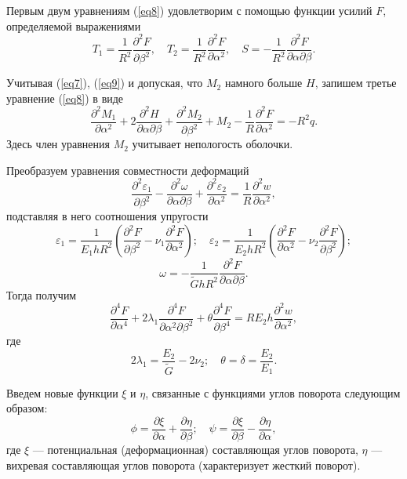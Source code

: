 \documentclass[press]{vestnik}
\begin{document}
Первым двум уравнениям (\ref{eq8}) удовлетворим с помощью функции усилий $F$, 
определяемой выражениями
\begin{equation}
\label{eq9}
T_{1} =\frac{1}{R^{2}}\frac{\partial^{2}F}{\partial \beta^{2}},
\quad
T_{2} =\frac{1}{R^{2}}\frac{\partial^{2}F}{\partial \alpha^{2}},
\quad
S=-\frac{1}{R^{2}}\frac{\partial^{2}F}{\partial \alpha \partial \beta }.
\end{equation}

Учитывая (\ref{eq7}), (\ref{eq9}) и допуская, что $M_{2} $ намного больше $H$, запишем 
третье уравнение (\ref{eq8}) в виде
\begin{equation}
\label{eq10}
\frac{\partial^{2}M_{1} }{\partial \alpha^{2}}+2\frac{\partial 
^{2}H}{\partial \alpha \partial \beta }+\frac{\partial^{2}M_{2} }{\partial 
\beta^{2}}+M_{2} -\frac{1}{R}\frac{\partial^{2}F}{\partial \alpha 
^{2}}=-R^{2}q.
\end{equation}
Здесь член уравнения $M_{2} $ учитывает непологость оболочки.

Преобразуем уравнения совместности деформаций
\[
\frac{\partial^{2}\varepsilon_{1} }{\partial \beta^{2}}-\frac{\partial 
^{2}\omega }{\partial \alpha \partial \beta }+\frac{\partial^{2}\varepsilon 
_{2} }{\partial \alpha^{2}}=\frac{1}{R}\frac{\partial^{2}w}{\partial 
\alpha^{2}},
\]
подставляя в него соотношения упругости
\[
\varepsilon_{1} =\frac{1}{E_{1} hR^{2}}\left( {\frac{\partial 
^{2}F}{\partial \beta^{2}}-\nu_{1} \frac{\partial^{2}F}{\partial \alpha 
^{2}}} \right);
\quad
\varepsilon_{2} =\frac{1}{E_{2} hR^{2}}\left( {\frac{\partial 
^{2}F}{\partial \alpha^{2}}-\nu_{2} \frac{\partial^{2}F}{\partial \beta 
^{2}}} \right);
\]
\[
\omega =-\frac{1}{\tilde{{G}}hR^{2}}\frac{\partial^{2}F}{\partial \alpha 
\partial \beta }.
\]
Тогда получим
\begin{equation}
\label{eq11}
\frac{\partial^{4}F}{\partial \alpha^{4}}+2\lambda_{1} \frac{\partial 
^{4}F}{\partial \alpha^{2}\partial \beta^{2}}+\theta \frac{\partial 
^{4}F}{\partial \beta^{4}}=RE_{2} h\frac{\partial^{2}w}{\partial \alpha 
^{2}},
\end{equation}
где 
\[
2\lambda_{1} =\frac{E_{2} }{\tilde{{G}}}-2\nu_{2}; \quad \theta =\delta 
=\frac{E_{2} }{E_{1} }.
\]

Введем новые функции $\xi $ и $\eta $, связанные с функциями углов поворота 
следующим образом:
\begin{equation}
\label{eq12}
\phi =\frac{\partial \xi }{\partial \alpha }+\frac{\partial \eta }{\partial 
\beta };
\quad
\psi =\frac{\partial \xi }{\partial \beta }-\frac{\partial \eta }{\partial 
\alpha },
\end{equation}
где $\xi $ --- потенциальная (деформационная) составляющая углов поворота, 
$\eta $ --- вихревая составляющая углов поворота (характеризует жесткий 
поворот).
\end{document}
